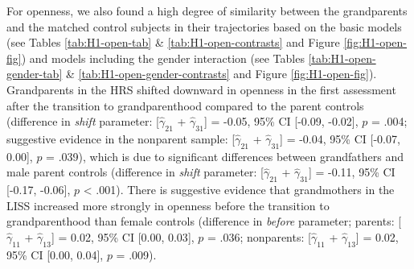 \documentclass[
  english,
  man, noextraspace]{apa7}
\begin{document}
For openness, we also found a high degree of similarity between the grandparents and the matched control subjects in their trajectories based on the basic models (see Tables \ref{tab:H1-open-tab} \& \ref{tab:H1-open-contrasts} and Figure \ref{fig:H1-open-fig}) and models including the gender interaction (see Tables \ref{tab:H1-open-gender-tab} \& \ref{tab:H1-open-gender-contrasts} and Figure \ref{fig:H1-open-fig}). Grandparents in the HRS shifted downward in openness in the first assessment after the transition to grandparenthood compared to the parent controls (difference in \emph{shift} parameter: {[}\(\hat{\gamma}_{21}\) + \(\hat{\gamma}_{31}\){]} = -0.05, 95\% CI {[}-0.09, -0.02{]}, \(p\) = .004; suggestive evidence in the nonparent sample: {[}\(\hat{\gamma}_{21}\) + \(\hat{\gamma}_{31}\){]} = -0.04, 95\% CI {[}-0.07, 0.00{]}, \(p\) = .039), which is due to significant differences between grandfathers and male parent controls (difference in \emph{shift} parameter: {[}\(\hat{\gamma}_{21}\) + \(\hat{\gamma}_{31}\){]} = -0.11, 95\% CI {[}-0.17, -0.06{]}, \(p\) \textless{} .001). There is suggestive evidence that grandmothers in the LISS increased more strongly in openness before the transition to grandparenthood than female controls (difference in \emph{before} parameter; parents: {[}\(\hat{\gamma}_{11}\) + \(\hat{\gamma}_{13}\){]} = 0.02, 95\% CI {[}0.00, 0.03{]}, \(p\) = .036; nonparents: {[}\(\hat{\gamma}_{11}\) + \(\hat{\gamma}_{13}\){]} = 0.02, 95\% CI {[}0.00, 0.04{]}, \(p\) = .009).\\
\end{document}
